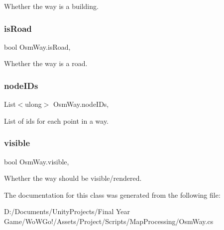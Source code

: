 Whether the way is a building. 

\mbox{\label{class_osm_way_a53b5c420fc8da5a3ae30d3a882d9b168}} 
\subsubsection{\texorpdfstring{isRoad}{isRoad}}
{\footnotesize\ttfamily bool Osm\+Way.\+is\+Road\hspace{0.3cm}{\ttfamily [get]}, {}}



Whether the way is a road. 

\mbox{\label{class_osm_way_a39fae3a4cca779c2f96ebeb25cf98631}} 
\subsubsection{\texorpdfstring{nodeIDs}{nodeIDs}}
{\footnotesize\ttfamily List$<$ulong$>$ Osm\+Way.\+node\+I\+Ds\hspace{0.3cm}{\ttfamily [get]}, {}}



List of ids for each point in a way. 

\mbox{\label{class_osm_way_a53d64092eb3c266aca3b849519bf18b6}} 
\subsubsection{\texorpdfstring{visible}{visible}}
{\footnotesize\ttfamily bool Osm\+Way.\+visible\hspace{0.3cm}{\ttfamily [get]}, {}}



Whether the way should be visible/rendered. 



The documentation for this class was generated from the following file\+:\begin{DoxyCompactItemize}
\item 
D\+:/\+Documents/\+Unity\+Projects/\+Final Year Game/\+Wo\+W\+Go!/\+Assets/\+Project/\+Scripts/\+Map\+Processing/Osm\+Way.\+cs\end{DoxyCompactItemize}
